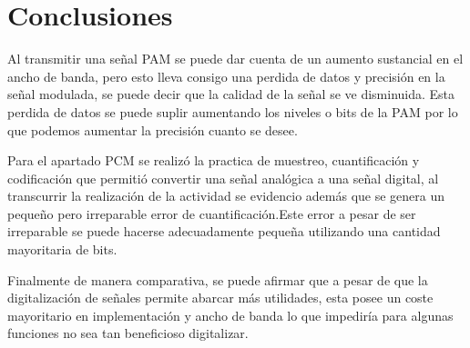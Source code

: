 \section{Conclusiones}\label{sec:conclusiones}

Al transmitir una señal PAM se puede dar cuenta de un aumento sustancial en el ancho de banda, pero esto lleva consigo una perdida de datos y precisión en la señal modulada, se puede decir que la calidad de la señal se ve disminuida. Esta perdida de datos se puede suplir aumentando los niveles o bits de la PAM por lo que podemos aumentar la precisión cuanto se desee.

Para el apartado PCM se realizó la practica de muestreo, cuantificación y codificación que permitió convertir una señal analógica a una señal digital, al transcurrir la realización de la actividad se  evidencio además que se genera un pequeño  pero irreparable error de  cuantificación.Este error a pesar de ser irreparable se puede hacerse adecuadamente pequeña utilizando una cantidad mayoritaria de bits.

Finalmente de manera comparativa, se puede afirmar que a pesar de que la digitalización de señales permite abarcar más utilidades, esta posee un coste mayoritario en implementación y ancho de banda lo que impediría para algunas funciones no sea tan beneficioso digitalizar.

